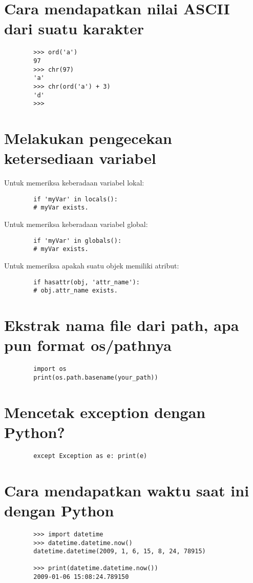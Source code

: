 \documentclass{article}
\begin{document}
	\section {Cara mendapatkan nilai ASCII dari suatu karakter}
	\begin{lstlisting}
		>>> ord('a')
		97
		>>> chr(97)
		'a'
		>>> chr(ord('a') + 3)
		'd'
		>>>
	\end{lstlisting}

	\section {Melakukan pengecekan ketersediaan variabel}
	Untuk memeriksa keberadaan variabel lokal:
	\begin{lstlisting}
		if 'myVar' in locals():
		# myVar exists.
	\end{lstlisting}
	Untuk memeriksa keberadaan variabel global:
	\begin{lstlisting}
		if 'myVar' in globals():
		# myVar exists.
	\end{lstlisting}
	Untuk memeriksa apakah suatu objek memiliki atribut:
	\begin{lstlisting}
		if hasattr(obj, 'attr_name'):
		# obj.attr_name exists.
	\end{lstlisting}

	\section {Ekstrak nama file dari path, apa pun format os/pathnya}
	\begin{lstlisting}
		import os
		print(os.path.basename(your_path))
	\end{lstlisting}

	\section {Mencetak exception dengan Python?}
	\begin{lstlisting}
		except Exception as e: print(e)
	\end{lstlisting}

	\section {Cara mendapatkan waktu saat ini dengan Python}
	\begin{lstlisting}
		>>> import datetime
		>>> datetime.datetime.now()
		datetime.datetime(2009, 1, 6, 15, 8, 24, 78915)
		
		>>> print(datetime.datetime.now())
		2009-01-06 15:08:24.789150
	\end{lstlisting}
\end{document}
